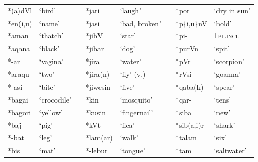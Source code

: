 \begin{center}
\tablehead{}
\begin{supertabular}{m{0.70045984in}m{1.0330598in}m{0.11705985in}m{0.7490598in}m{1.2150599in}m{0.12545985in}m{0.77335984in}m{0.81365985in}}
*(a)dVl\footnotemark{} &
{\textquoteleft}bird{\textquoteright} &
 &
*jari\footnotemark{} &
{\textquoteleft}laugh{\textquoteright} &
 &
*por &
{\textquoteleft}dry in sun{\textquoteright}\\
*en(i,u) &
{\textquoteleft}name{\textquoteright} &
 &
*jasi &
{\textquoteleft}bad, broken{\textquoteright} &
 &
*p\{i,u\}nV &
{\textquoteleft}hold{\textquoteright}\\
*aman &
{\textquoteleft}thatch{\textquoteright} &
 &
*jibV &
{\textquoteleft}star{\textquoteright} &
 &
*pi- &
\textsc{1pl.incl}\\
*aqana &
{\textquoteleft}black{\textquoteright} &
 &
*jibar &
{\textquoteleft}dog{\textquoteright} &
 &
*purVn &
{\textquoteleft}spit{\textquoteright}\\
*-ar &
{\textquoteleft}vagina{\textquoteright} &
 &
*jira &
{\textquoteleft}water{\textquoteright} &
 &
*pVr &
{\textquoteleft}scorpion{\textquoteright}\\
*araqu &
{\textquoteleft}two{\textquoteright} &
 &
*jira(n) &
{\textquoteleft}fly{\textquoteright} (v.) &
 &
*rVsi &
{\textquoteleft}goanna{\textquoteright}\\
*-asi &
{\textquoteleft}bite{\textquoteright} &
 &
*jiwesin &
{\textquoteleft}five{\textquoteright} &
 &
*qaba(k) &
{\textquoteleft}spear{\textquoteright}\\
*bagai &
{\textquoteleft}crocodile{\textquoteright} &
 &
*kin &
{\textquoteleft}mosquito{\textquoteright} &
 &
*qar- &
{\textquoteleft}tens{\textquoteright}\\
*bagori &
{\textquoteleft}yellow{\textquoteright} &
 &
*kusin &
{\textquoteleft}fingernail{\textquoteright} &
 &
*siba\footnotemark{} &
{\textquoteleft}new{\textquoteright}\\
*baj &
{\textquoteleft}pig{\textquoteright} &
 &
*kVt &
{\textquoteleft}flea{\textquoteright} &
 &
*sib(a,i)r &
{\textquoteleft}shark{\textquoteright}\\
*-bat &
{\textquoteleft}leg{\textquoteright} &
 &
*lam(ar) &
{\textquoteleft}walk{\textquoteright} &
 &
*talam &
{\textquoteleft}six{\textquoteright}\\
*bis &
{\textquoteleft}mat{\textquoteright} &
 &
*-lebur &
{\textquoteleft}tongue{\textquoteright} &
 &
*tam &
{\textquoteleft}saltwater{\textquoteright}\\

\end{supertabular}
\end{center}
